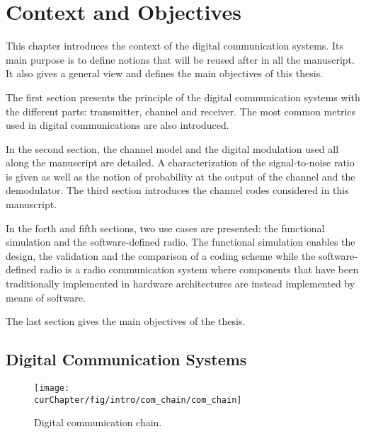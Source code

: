 
\newcommand{\curChapter}{main/chapter1}

\chapter{Context and Objectives}
\label{chap:ctx}

This chapter introduces the context of the digital communication systems. Its
main purpose is to define notions that will be reused after in all the
manuscript. It also gives a general view and defines the main
objectives of this thesis.

The first section presents the principle of the digital communication systems
with the different parts: transmitter, channel and receiver. The most common
metrics used in digital communications are also introduced.

In the second section, the channel model and the digital modulation used all
along the manuscript are detailed. A characterization of the signal-to-noise
ratio is given as well as the notion of probability at the output of the channel
and the demodulator. The third section introduces the channel codes considered
in this manuscript.

In the forth and fifth sections, two use cases are presented: the functional
simulation and the software-defined radio. The functional simulation enables the
design, the validation and the comparison of a coding scheme while the
software-defined radio is a radio communication system where components that
have been traditionally implemented in hardware architectures are instead
implemented by means of software.

The last section gives the main objectives of the thesis.

\vspace*{\fill}
\minitoccustom
\vspace*{\fill}

\section{Digital Communication Systems}
\label{sec:ctx_digital_communication_systems}

\begin{figure}[htp]
  \centering
  \texttt{[image: \\curChapter/fig/intro/com\_chain/com\_chain]}
  \caption{Digital communication chain.}
  \label{fig:ctx_com_chain}
\end{figure}

